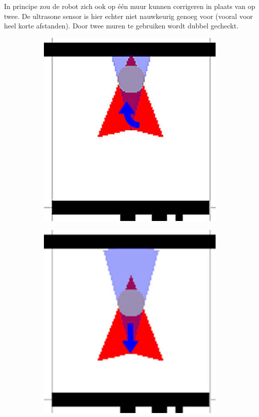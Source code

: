 \documentclass[t1]{penoverslag}
\begin{document}
In principe zou de robot zich ook op \'e\'en muur kunnen corrigeren in plaats van op twee. De ultrasone sensor is hier echter niet nauwkeurig genoeg voor (vooral voor heel korte afstanden). Door twee muren te gebruiken wordt dubbel gecheckt.

\begin{figure}
        \centering
        \begin{subfigure}[hb]{0.2\textwidth}
                \centering
                \includegraphics[width=\textwidth]{muur2}
        \end{subfigure}%
        \begin{subfigure}[hb]{0.2\textwidth}
                \centering
                \includegraphics[width=\textwidth]{muur3}

\end{subfigure}
\end{figure}
\end{document}
